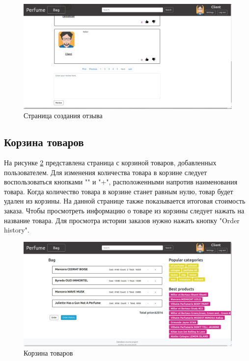 \captionsetup{singlelinecheck = false, justification=centering}
\begin{figure}[h!]
	\begin{center}
		\includegraphics[scale=0.45]{assets/site_create_review.jpg}
	\end{center}
	\caption{Страница создания отзыва}
	\label{site_create_review}
\end{figure}

\subsection{Корзина товаров}

На рисунке \ref{site_bag} представлена страница с корзиной товаров, добавленных пользователем. Для изменения количества товара в корзине следует воспользоваться кнопками "\-" и "+", расположенными напротив наименования товара. Когда количество товара в корзине станет равным нулю, товар будет удален из корзины. На данной странице также показывается итоговая стоимость заказа. Чтобы просмотреть информацию о товаре из корзины следует нажать на название товара. Для просмотра истории заказов нужно нажать кнопку "Order history".

\captionsetup{singlelinecheck = false, justification=centering}
\begin{figure}[h!]
	\begin{center}
		\includegraphics[scale=0.45]{assets/site_bag.jpg}
	\end{center}
	\caption{Корзина товаров}
	\label{site_bag}
\end{figure}

